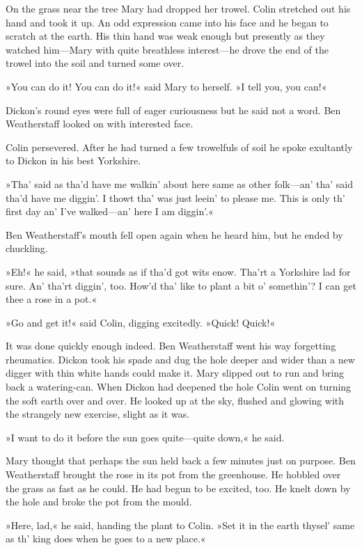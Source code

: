 On the grass near the tree Mary had dropped her trowel. Colin stretched out his hand and took it up. An odd expression came into his face and he began to scratch at the earth. His thin hand was weak enough but presently as they watched him—Mary with quite breathless interest—he drove the end of the trowel into the soil and turned some over.

»You can do it! You can do it!« said Mary to herself. »I tell you, you can!«

Dickon's round eyes were full of eager curiousness but he said not a word. Ben Weatherstaff looked on with interested face.

Colin persevered. After he had turned a few trowelfuls of soil he spoke exultantly to Dickon in his best Yorkshire.

»Tha' said as tha'd have me walkin' about here same as other folk—an' tha' said tha'd have me diggin'. I thowt tha' was just leein' to please me. This is only th' first day an' I've walked—an' here I am diggin'.«

Ben Weatherstaff's mouth fell open again when he heard him, but he ended by chuckling.

»Eh!« he said, »that sounds as if tha'd got wits enow. Tha'rt a Yorkshire lad for sure. An' tha'rt diggin', too. How'd tha' like to plant a bit o' somethin'? I can get thee a rose in a pot.«

»Go and get it!« said Colin, digging excitedly. »Quick! Quick!«

It was done quickly enough indeed. Ben Weatherstaff went his way forgetting rheumatics. Dickon took his spade and dug the hole deeper and wider than a new digger with thin white hands could make it. Mary slipped out to run and bring back a watering-can. When Dickon had deepened the hole Colin went on turning the soft earth over and over. He looked up at the sky, flushed and glowing with the strangely new exercise, slight as it was.

»I want to do it before the sun goes quite—quite down,« he said.

Mary thought that perhaps the sun held back a few minutes just on purpose. Ben Weatherstaff brought the rose in its pot from the greenhouse. He hobbled over the grass as fast as he could. He had begun to be excited, too. He knelt down by the hole and broke the pot from the mould.

»Here, lad,« he said, handing the plant to Colin. »Set it in the earth thysel' same as th' king does when he goes to a new place.«


